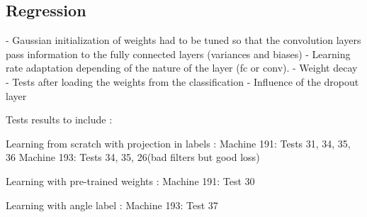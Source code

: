 \subsection{Regression}

- Gaussian initialization of weights had to be tuned so that the convolution layers pass information to the fully connected layers (variances and biases)
- Learning rate adaptation depending of the nature of the layer (fc or conv).
- Weight decay
- Tests after loading the weights from the classification
- Influence of the dropout layer

Tests results to include :

Learning from scratch with projection in labels :
Machine 191: Tests 31, 34, 35, 36
Machine 193: Tests 34, 35, 26(bad filters but good loss)

Learning with pre-trained weights :
Machine 191: Test 30

Learning with angle label :
Machine 193: Test 37
